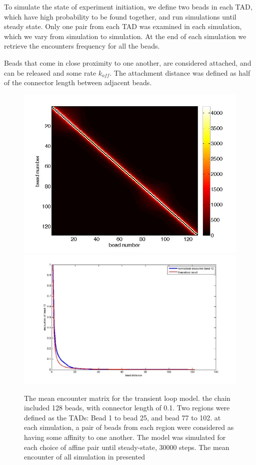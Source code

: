 \documentclass[12pt]{paper}
\begin{document}
To simulate the state of experiment initiation, we define two beads in each TAD, which have high probability to be found together, and run simulations until steady state. Only one pair from each TAD was examined in each simulation, which we vary from simulation to simulation. At the end of each simulation we retrieve the encounters frequency for all the beads. 

Beads that come in close proximity to one another, are considered attached, and can be released and some rate $k_{off}$. The attachment distance was defined as half of the connector length between adjacent beads. 

\begin{figure}[H]
\includegraphics[scale=0.2]{encounterFrequency128beadsWithTadTransientModel}
\includegraphics[scale=0.2]{encounterCrossectionBead12TransientLoopModelwithTheoreticalCurve}
\caption{\scriptsize{The mean encounter matrix for the transient loop model. the chain included 128 beads, with connector length of 0.1. Two regions were defined as the TADs: Bead 1 to bead 25, and bead 77 to 102. at each simulation, a pair of beads from each region were considered as having some affinity to one another. The model was simulated for each choice of affine pair until steady-state, 30000 steps. The mean encounter of all simulation in presented}} 
\end{figure}
\end{document}
